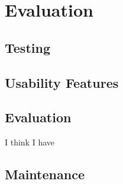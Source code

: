 ﻿\documentclass{article}
\begin{document}
    \section{Evaluation}
    \subsection{Testing}
    \subsection{Usability Features}
    \subsection{Evaluation}
    I think I have 
    \subsection{Maintenance}
\end{document}
